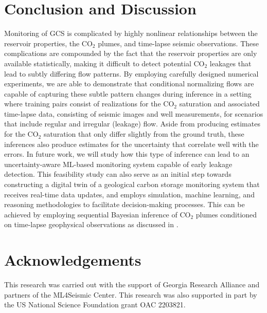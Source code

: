 \documentclass{article}
\begin{document}
\section{Conclusion and Discussion}
%
Monitoring of GCS is complicated by highly nonlinear relationships between the reservoir properties, the CO$_2$ plumes, and time-lapse seismic observations. These complications are compounded by the fact that the reservoir properties are only available statistically, making it difficult to detect potential CO$_2$ leakages that lead to subtly differing flow patterns. By employing carefully designed numerical experiments, we are able to demonstrate that conditional normalizing flows are capable of capturing these subtle pattern changes during inference in a setting where training pairs consist of realizations for the CO$_2$ saturation and associated time-lapse data, consisting of seismic images and well measurements, for scenarios that include regular and irregular (leakage) flow. Aside from producing estimates for the CO$_2$ saturation that only differ slightly from the ground truth, these inferences also produce estimates for the uncertainty that correlate well with the errors. In future work, we will study how this type of inference can lead to an uncertainty-aware ML-based monitoring system capable of early leakage detection. This feasibility study can also serve as an initial step towards constructing a digital twin of a geological carbon storage monitoring system that receives real-time data updates, and employs simulation, machine learning, and reasoning methodologies to facilitate decision-making processes. This can be achieved by employing sequential Bayesian inference of CO$_2$ plumes conditioned on time-lapse geophysical observations as discussed in \cite{herrmann2023dte}.

%

\section{Acknowledgements}
This research was carried out with the support of Georgia Research Alliance and partners of the ML4Seismic Center. This research was also supported in part by the US National Science Foundation grant OAC 2203821.
\end{document}
